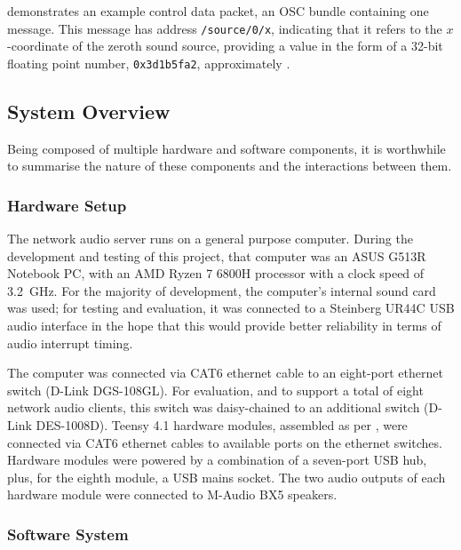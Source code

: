  demonstrates an example control data
packet, an OSC bundle containing one message.
This message has address \texttt{/source/0/x}, indicating that it refers to the
$x$-coordinate of the zeroth sound source, providing a value in the form of a
32-bit floating point number, \texttt{0x3d1b5fa2}, approximately
.

\subsection{System Overview}\label{subsec:system-overview}

Being composed of multiple hardware and software components, it is worthwhile
to summarise the nature of these components and the interactions between them.

\subsubsection{Hardware Setup}

The network audio server runs on a general purpose computer.
During the development and testing of this project, that computer was an ASUS
G513R Notebook PC, with an AMD Ryzen 7 6800H processor with a clock
speed of \qty{3.2}{\GHz}.
For the majority of development, the computer's internal sound card was used;
for testing and evaluation, it was connected to a Steinberg UR44C USB audio
interface in the hope that this would provide better reliability in terms of
audio interrupt timing.

The computer was connected via CAT6 ethernet cable to an eight-port ethernet
switch (D-Link DGS-108GL).
For evaluation, and to support a total of eight network audio clients, this
switch was daisy-chained to an additional switch (D-Link DES-1008D).
Teensy 4.1 hardware modules, assembled as per , were
connected via CAT6 ethernet cables to available ports on the ethernet switches.
Hardware modules were powered by a combination of a seven-port USB hub, plus,
for the eighth module, a USB mains socket.
The two audio outputs of each hardware module were connected to M-Audio BX5
speakers.

\subsubsection{Software System}\label{subsubsec:software-system}

